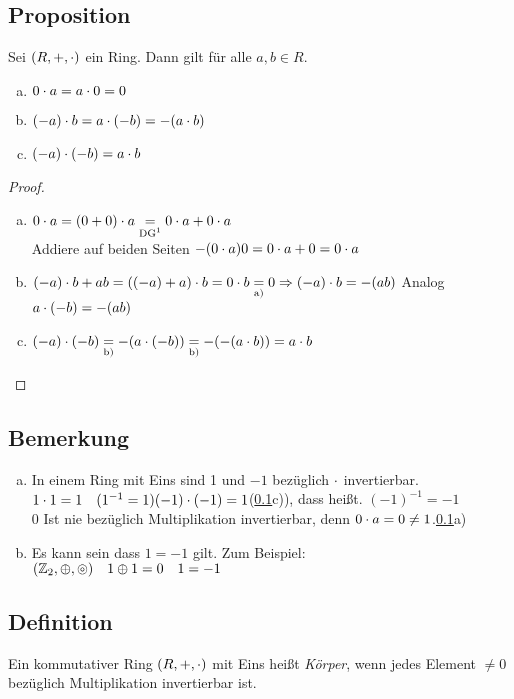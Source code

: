 \subsection{Proposition}\label{sec:1.14}
Sei $(R,+,\cdot)$ ein Ring. Dann gilt für alle $a,b \in R$.
\begin{enumerate}[a)]
\item $0 \cdot a = a \cdot 0 = 0$
\item $(-a) \cdot b = a \cdot (-b) = - (a \cdot b)$
\item $(-a) \cdot (-b) = a \cdot b$
\end{enumerate}
\begin{proof}\ 
\begin{enumerate}[a)]
\item $0 \cd a = (0 + 0)\cd a\underset{\text{DG\footnotemark}}{=} 0 \cd a + 0 \cd a$\\
\footnotetext[2]{Distributivgesetz}Addiere auf beiden Seiten $-(0 \cdot a)\\
0 = 0 \cdot a + 0 = 0 \cdot a$
\item $(-a) \cdot b + ab = ((-a)+ a) \cdot b = 0 \cdot b \underset{\text{a)}}{=} 0\\
\Rightarrow (-a) \cdot b = -(ab)$ Analog $a \cdot (-b) = -(ab)$
\item $(-a) \cdot (-b) \underset{\text{b)}}{=} - (a \cdot (-b)) \underset{\text{b)}}{=} -(- (a \cdot b)) = a \cdot b$
\end{enumerate}
\end{proof}
\subsection{Bemerkung}\label{sec:1.15}
\begin{enumerate}[a)]
\item In einem Ring mit Eins sind 1 und $-1$ bezüglich $\cdot$ invertierbar.\\
$1 \cdot 1 = 1\quad(1^{-1} =1)\\
(-1)\cdot (-1) = 1$\quad (\ref{sec:1.14}c)), dass hei\ss t. $(-1)^{-1} = -1$\\
0 Ist nie bezüglich Multiplikation invertierbar, denn $0 \cdot a = 0 \ne 1$.\quad\ref{sec:1.14}a)
\item Es kann sein dass $ 1 = -1$ gilt. Zum Beispiel:\\
$(\mathbb{Z}_2, \oplus, \circledcirc)\quad 1\oplus 1 = 0\quad 1 = -1$
\end{enumerate}
\subsection{Definition}
Ein kommutativer Ring $(R,+,\cdot)$ mit Eins hei\ss t \emph{Körper}, wenn jedes Element $\ne 0$ bezüglich Multiplikation invertierbar ist.

